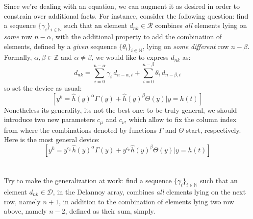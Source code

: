 Since we're dealing with an equation, we can augment it as desired in order to
constrain over additional facts. For instance, consider the following question:
find a sequence $\lbrace \gamma_{i} \rbrace_{i\in\mathbb{N}}$ such that 
an element $d_{nk}\in\mathcal{R}$ combines \emph{all} elements lying on 
\emph{some} row $n-\alpha$, with the additional property to add the combination of 
elements, defined by a \emph{given} sequence $\lbrace \theta_{i} \rbrace_{i\in\mathbb{N}}$, 
lying on \emph{some different} row $n-\beta$. Formally, $\alpha,\beta\in\mathbb{Z}$ 
and $\alpha \not=\beta$, we would like to express $d_{nk}$ as:
\begin{displaymath}
    d_{nk} = \sum_{i=0}^{n-\alpha}{\gamma_{i}\,d_{n-\alpha,i}} + 
        \sum_{i=0}^{n-\beta}{\theta_{i}\,d_{n-\beta,i}}
\end{displaymath}
so set the device as usual:
\begin{displaymath}
    \left[y^{k} = \hat{h}(y)^{\alpha} \Gamma(y) + \hat{h}(y)^{\beta} \Theta(y) \big| y = h(t) \right]
\end{displaymath}
Nonetheless its generality, its not the best one: to be truly general,
we should introduce two new parameters $c_\mu$ and $c_\nu$, which allow
to fix the column index from where the combinations denoted by functions
$\Gamma$ and $\Theta$ start, respectively. Here is the most general device:
\begin{displaymath}
    \left[y^{k} = y^{c_\mu}\hat{h}(y)^{\alpha} \Gamma(y) + 
        y^{c_\nu}\hat{h}(y)^{\beta} \Theta(y) \big| y = h(t) \right]
\end{displaymath}
\\\\
Try to make the generalization at work:
find a sequence $\lbrace \gamma_{i} \rbrace_{i\in\mathbb{N}}$ such that 
an element $d_{nk}\in\mathcal{D}$, in the Delannoy array, 
combines \emph{all} elements lying on 
the next row, namely $n+1$, in addition to the
combination of elements lying two row above, namely $n-2$, 
defined as their sum, simply. 

